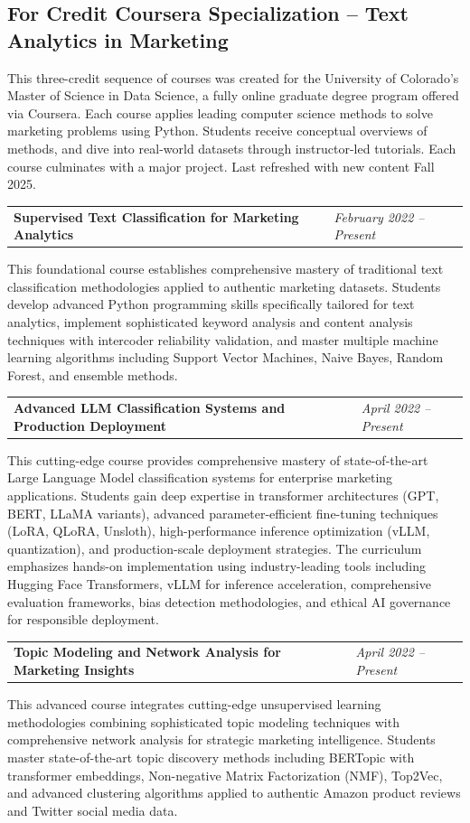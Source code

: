\documentclass[11pt,letterpaper]{article}
\makeatletter
\newcommand{\cvcourse}[3]{%
  \begin{tabularx}{\textwidth}{@{}X >{\raggedleft\arraybackslash}p{0.33\textwidth}@{}}%
    \textbf{#1} & \textit{#2} \\
  \end{tabularx}\par
  {\small #3}\par
  \vspace{0.35em}
}
\makeatother
\begin{document}
\subsection*{For Credit Coursera Specialization -- Text Analytics in Marketing}
{\small This three-credit sequence of courses was created for the University of Colorado's Master of Science in Data Science, a fully online graduate degree program offered via Coursera. Each course applies leading computer science methods to solve marketing problems using Python. Students receive conceptual overviews of methods, and dive into real-world datasets through instructor-led tutorials. Each course culminates with a major project. Last refreshed with new content Fall 2025.}\par
\vspace{0.5em}
\cvcourse{Supervised Text Classification for Marketing Analytics}{February 2022 -- Present}{This foundational course establishes comprehensive mastery of traditional text classification methodologies applied to authentic marketing datasets. Students develop advanced Python programming skills specifically tailored for text analytics, implement sophisticated keyword analysis and content analysis techniques with intercoder reliability validation, and master multiple machine learning algorithms including Support Vector Machines, Naive Bayes, Random Forest, and ensemble methods.}
\cvcourse{Advanced LLM Classification Systems and Production Deployment}{April 2022 -- Present}{This cutting-edge course provides comprehensive mastery of state-of-the-art Large Language Model classification systems for enterprise marketing applications. Students gain deep expertise in transformer architectures (GPT, BERT, LLaMA variants), advanced parameter-efficient fine-tuning techniques (LoRA, QLoRA, Unsloth), high-performance inference optimization (vLLM, quantization), and production-scale deployment strategies. The curriculum emphasizes hands-on implementation using industry-leading tools including Hugging Face Transformers, vLLM for inference acceleration, comprehensive evaluation frameworks, bias detection methodologies, and ethical AI governance for responsible deployment.}
\cvcourse{Topic Modeling and Network Analysis for Marketing Insights}{April 2022 -- Present}{This advanced course integrates cutting-edge unsupervised learning methodologies combining sophisticated topic modeling techniques with comprehensive network analysis for strategic marketing intelligence. Students master state-of-the-art topic discovery methods including BERTopic with transformer embeddings, Non-negative Matrix Factorization (NMF), Top2Vec, and advanced clustering algorithms applied to authentic Amazon product reviews and Twitter social media data.}
\end{document}
